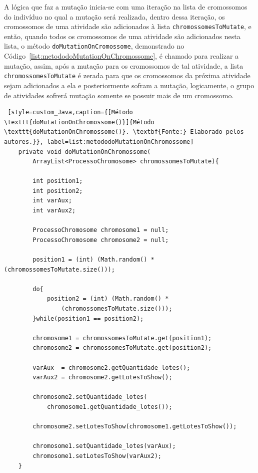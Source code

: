 \par A lógica que faz a mutação inicia-se com uma iteração na lista de cromossomos do 
indivíduo no qual a mutação será realizada, dentro dessa iteração, os cromossomos de uma atividade são adicionados
à lista \texttt{chromossomesToMutate}, e então, quando todos os cromossomos de uma atividade são adicionados nesta
lista, o método \texttt{doMutationOnCromo\-ssome}, demonstrado no
Código~\ref{list:metododoMutationOnChromossome}, é chamado para realizar a mutação, assim, após a mutação para os cromossomos de tal atividade, a lista \texttt{chromossomesToMutate} é zerada para que os cromossomos da próxima atividade sejam adicionados a ela e posteriormente sofram a mutação, logicamente, o grupo de atividades sofrerá mutação somente se possuir mais de um cromossomo.

\begin{lstlisting} [style=custom_Java,caption={[Método \texttt{doMutationOnChromossome()}]{Método \texttt{doMutationOnChromossome()}. \textbf{Fonte:} Elaborado pelos autores.}}, label=list:metododoMutationOnChromossome] 
	private void doMutationOnChromossome(
		ArrayList<ProcessoChromosome> chromossomesToMutate){
	
		int position1;
		int position2;
		int varAux;
		int varAux2;
		
		ProcessoChromosome chromosome1 = null;
		ProcessoChromosome chromosome2 = null;
		
		position1 = (int) (Math.random() * (chromossomesToMutate.size()));
		
		do{
			position2 = (int) (Math.random() * 
				(chromossomesToMutate.size()));
		}while(position1 == position2);
	
		chromosome1 = chromossomesToMutate.get(position1);
		chromosome2 = chromossomesToMutate.get(position2);
		
		varAux  = chromosome2.getQuantidade_lotes();
		varAux2 = chromosome2.getLotesToShow();
		
		chromosome2.setQuantidade_lotes(
			chromosome1.getQuantidade_lotes());
			
		chromosome2.setLotesToShow(chromosome1.getLotesToShow());
		
		chromosome1.setQuantidade_lotes(varAux);
		chromosome1.setLotesToShow(varAux2);
	}

\end{lstlisting}

